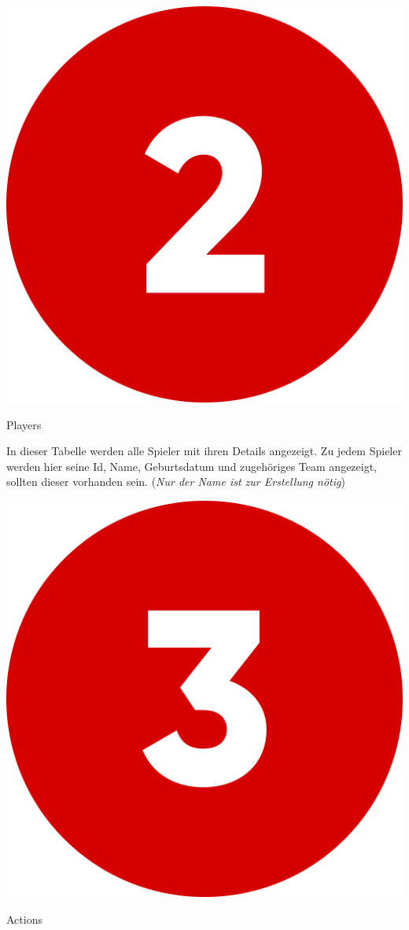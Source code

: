 \bigskip
\includegraphics[scale=0.05]{pics/user-guide/numbers/number-2.png} \begin{LARGE} Players \end{LARGE}

In dieser Tabelle werden alle Spieler mit ihren Details angezeigt. Zu jedem Spieler werden hier seine Id, Name, Geburtsdatum und zugehöriges Team angezeigt,
sollten dieser vorhanden sein. (\textit{Nur der Name ist zur Erstellung nötig})

\bigskip
\includegraphics[scale=0.05]{pics/user-guide/numbers/number-3.png} \begin{LARGE} Actions \end{LARGE}

